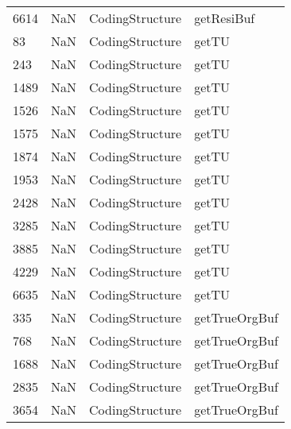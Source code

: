 \begin{tabular}{llll}
6614 &                   NaN &            CodingStructure &                                getResiBuf \\
83   &                   NaN &            CodingStructure &                                     getTU \\
243  &                   NaN &            CodingStructure &                                     getTU \\
1489 &                   NaN &            CodingStructure &                                     getTU \\
1526 &                   NaN &            CodingStructure &                                     getTU \\
1575 &                   NaN &            CodingStructure &                                     getTU \\
1874 &                   NaN &            CodingStructure &                                     getTU \\
1953 &                   NaN &            CodingStructure &                                     getTU \\
2428 &                   NaN &            CodingStructure &                                     getTU \\
3285 &                   NaN &            CodingStructure &                                     getTU \\
3885 &                   NaN &            CodingStructure &                                     getTU \\
4229 &                   NaN &            CodingStructure &                                     getTU \\
6635 &                   NaN &            CodingStructure &                                     getTU \\
335  &                   NaN &            CodingStructure &                             getTrueOrgBuf \\
768  &                   NaN &            CodingStructure &                             getTrueOrgBuf \\
1688 &                   NaN &            CodingStructure &                             getTrueOrgBuf \\
2835 &                   NaN &            CodingStructure &                             getTrueOrgBuf \\
3654 &                   NaN &            CodingStructure &                             getTrueOrgBuf \\

\end{tabular}
